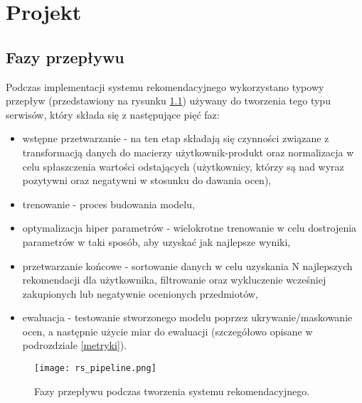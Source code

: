 
\chapter{Projekt}

\section{Fazy przepływu}

Podczas implementacji systemu rekomendacyjnego wykorzystano typowy przepływ (przedstawiony na rysunku \ref{fig:rs_pipeline}) używany do tworzenia tego typu serwisów, który składa się z następujące pięć faz:
\begin{itemize}
    \item wstępne przetwarzanie - na ten etap składają się czynności związane z transformacją danych do macierzy użytkownik-produkt oraz normalizacja w celu spłaszczenia wartości odstających (użytkownicy, którzy są nad wyraz pozytywni oraz negatywni w stosunku do dawania ocen),
    \item trenowanie - proces budowania modelu,
    \item optymalizacja hiper parametrów - wielokrotne trenowanie w celu dostrojenia parametrów w taki sposób, aby uzyskać jak najlepsze wyniki,
    \item przetwarzanie końcowe - sortowanie danych w celu uzyskania N najlepszych rekomendacji dla użytkownika, filtrowanie oraz wykluczenie wcześniej zakupionych lub negatywnie ocenionych przedmiotów,
    \item ewaluacja - testowanie stworzonego modelu poprzez ukrywanie/maskowanie ocen, a następnie użycie miar do ewaluacji (szczegółowo opisane w podrozdziale \ref{metryki}).
    
\end{itemize}{}

\begin{figure}
    \texttt{[image: rs\_pipeline.png]}
    \caption{Fazy przepływu podczas tworzenia systemu rekomendacyjnego.}
    \label{fig:rs_pipeline}
\end{figure}